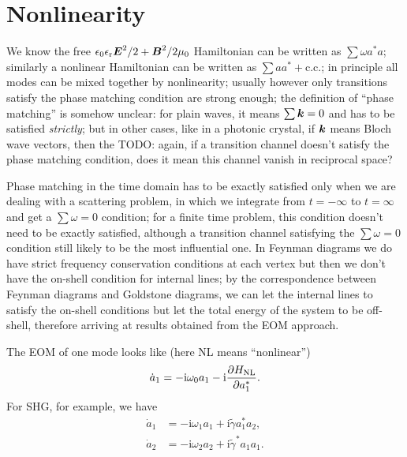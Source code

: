 \documentclass[hyperref, a4paper]{article}
\newcommand*{\ii}{\mathrm{i}}
\newcommand{\epsr}{\epsilon_{\text{r}}}
\begin{document}
\section{Nonlinearity}

We know the free $\epsilon_0 \epsr \vb*{E}^2 / 2 + \vb*{B}^2 / 2 \mu_0$ Hamiltonian 
can be written as $\sum \omega a^* a$; 
similarly a nonlinear Hamiltonian can be written as 
$\sum a a ^* + \text{c.c.}$; 
in principle all modes can be mixed together by nonlinearity; 
usually however only transitions satisfy the phase matching condition are strong enough;
the definition of ``phase matching'' is somehow unclear: 
for plain waves, it means $\sum \vb*{k} = 0$ 
and has to be satisfied \emph{strictly}; 
but in other cases, like in a photonic crystal, 
if $\vb*{k}$ means Bloch wave vectors, then the  
TODO: again, if a transition channel doesn't satisfy the phase matching condition, 
does it mean this channel vanish in reciprocal space?

Phase matching in the time domain has to be exactly satisfied 
only when we are dealing with a scattering problem, 
in which we integrate from $t=-\infty$ to $t = \infty$ 
and get a $\sum \omega = 0$ condition; 
for a finite time problem, this condition doesn't need to be exactly satisfied, 
although a transition channel satisfying the $\sum \omega = 0$ condition 
still likely to be the most influential one.
In Feynman diagrams we do have strict frequency conservation conditions at each vertex
but then we don't have the on-shell condition for internal lines; 
by the correspondence between Feynman diagrams and Goldstone diagrams, 
we can let the internal lines to satisfy the on-shell conditions 
but let the total energy of the system to be off-shell, 
therefore arriving at results obtained from the EOM approach.

The EOM of one mode looks like (here NL means ``nonlinear'')
\begin{equation}
    \dot{a}_1 = - \ii \omega_0 a_1 - \ii \pdv{H_{\text{NL}}}{a_1^*}.
\end{equation}
For SHG, for example, we have 
\begin{equation}
    \begin{aligned}
        \dot{a}_1 &= - \ii \omega_1 a_1 + \ii \tilde{\gamma}   a_1^* a_2, \\
        \dot{a}_2 &= - \ii \omega_2 a_2 + \ii \tilde{\gamma}^* a_1   a_1.
    \end{aligned} 
\end{equation}
\end{document}
